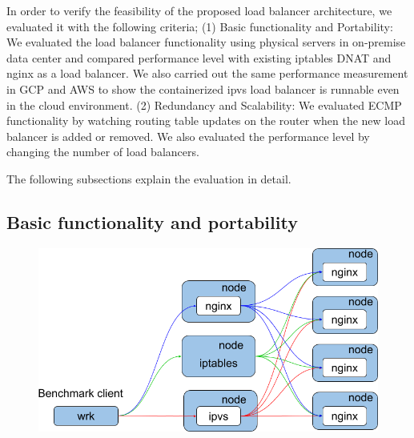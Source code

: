 In order to verify the feasibility of the proposed load balancer architecture, we evaluated it with the following criteria;
(1) Basic functionality and Portability:
We evaluated the load balancer functionality using physical servers in on-premise data center and compared performance level with existing iptables DNAT and nginx as a load balancer.
We also carried out the same performance measurement in GCP and AWS to show the containerized ipvs load balancer is runnable even in the cloud environment.
(2) Redundancy and Scalability:
We evaluated ECMP functionality by watching routing table updates on the router when the new load balancer is added or removed.
We also evaluated the performance level by changing the number of load balancers.

The following subsections explain the evaluation in detail.


\subsection{Basic functionality and portability}

\begin{figure}[t]
  \centering
  \includegraphics[width=0.7\columnwidth]{Figs/lb_single_schem}
  \caption{}
  \label{fig:lb_single_schem}
\end{figure}

